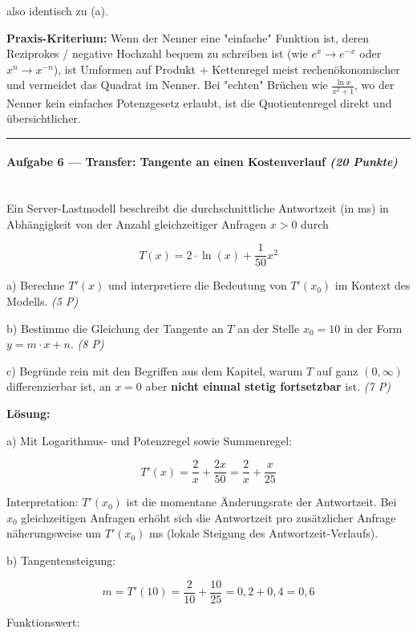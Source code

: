 \documentclass[11pt, a4paper]{article}
\begin{document}
also identisch zu (a).


\textbf{Praxis-Kriterium:} Wenn der Nenner eine "einfache" Funktion ist, deren Reziprokes / negative Hochzahl bequem zu schreiben ist (wie $e^x \to e^{-x}$ oder $x^n \to x^{-n}$), ist Umformen auf Produkt + Kettenregel meist rechenökonomischer und vermeidet das Quadrat im Nenner. Bei "echten" Brüchen wie $\frac{\ln x}{x^2+1}$, wo der Nenner kein einfaches Potenzgesetz erlaubt, ist die Quotientenregel direkt und übersichtlicher.



\noindent\textcolor{rulegray}{\rule{\linewidth}{0.4pt}}


\paragraph{Aufgabe 6 — Transfer: Tangente an einen Kostenverlauf \textit{(20 Punkte)}}\mbox{}\\[2pt]

Ein Server-Lastmodell beschreibt die durchschnittliche Antwortzeit (in ms) in Abhängigkeit von der Anzahl gleichzeitiger Anfragen $x > 0$ durch


\[
T(x) = 2\cdot \ln(x) + \frac{1}{50}x^2
\]


a) Berechne $T'(x)$ und interpretiere die Bedeutung von $T'(x_0)$ im Kontext des Modells. \textit{(5 P)}

b) Bestimme die Gleichung der Tangente an $T$ an der Stelle $x_0 = 10$ in der Form $y = m\cdot x + n$. \textit{(8 P)}

c) Begründe rein mit den Begriffen aus dem Kapitel, warum $T$ auf ganz $(0, \infty)$ differenzierbar ist, an $x = 0$ aber \textbf{nicht einmal stetig fortsetzbar} ist. \textit{(7 P)}


\textbf{Lösung:}


a) Mit Logarithmus- und Potenzregel sowie Summenregel:

\[
T'(x) = \frac{2}{x} + \frac{2x}{50} = \frac{2}{x} + \frac{x}{25}
\]


Interpretation: $T'(x_0)$ ist die momentane Änderungsrate der Antwortzeit. Bei $x_0$ gleichzeitigen Anfragen erhöht sich die Antwortzeit pro zusätzlicher Anfrage näherungsweise um $T'(x_0)$ ms (lokale Steigung des Antwortzeit-Verlaufs).


b) Tangentensteigung:

\[
m = T'(10) = \frac{2}{10} + \frac{10}{25} = 0{,}2 + 0{,}4 = 0{,}6
\]


Funktionswert:
\end{document}
